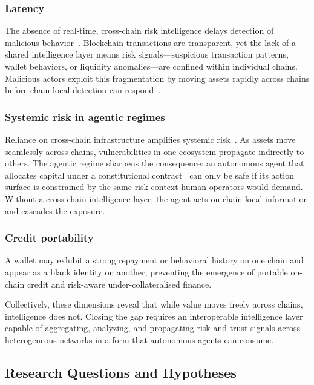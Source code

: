 \documentclass[journal]{IEEEtran}
\begin{document}
\subsubsection*{Latency}
The absence of real-time, cross-chain risk intelligence delays
detection of malicious behavior~\cite{MishraP25,NahaZ24}. Blockchain
transactions are transparent, yet the lack of a shared intelligence
layer means risk signals---suspicious transaction patterns, wallet
behaviors, or liquidity anomalies---are confined within individual
chains. Malicious actors exploit this fragmentation by moving assets
rapidly across chains before chain-local detection can
respond~\cite{DBLP:journals/spe/DelgadovonEitzenRMF25,DudaniBRM23}.

\subsubsection*{Systemic risk in agentic regimes}
Reliance on cross-chain infrastructure amplifies systemic
risk~\cite{LiQXZZWX25,ZhangZZL24}. As assets move seamlessly across
chains, vulnerabilities in one ecosystem propagate indirectly to
others. The agentic regime sharpens the consequence: an autonomous
agent that allocates capital under a constitutional
contract~\cite{bai2022constitutional} can only be safe if its action
surface is constrained by the same risk context human operators would
demand. Without a cross-chain intelligence layer, the agent acts on
chain-local information and cascades the exposure.

\subsubsection*{Credit portability}
A wallet may exhibit a strong repayment or behavioral history on one
chain and appear as a blank identity on another, preventing the
emergence of portable on-chain credit and risk-aware
under-collateralised finance.

Collectively, these dimensions reveal that while value moves freely
across chains, intelligence does not. Closing the gap requires an
interoperable intelligence layer capable of aggregating, analyzing, and
propagating risk and trust signals across heterogeneous networks in a
form that autonomous agents can consume.

\subsection{Research Questions and Hypotheses}\label{sec:rq}
\end{document}
